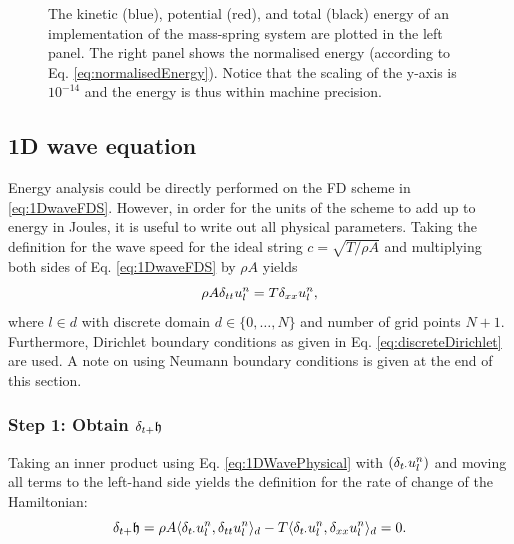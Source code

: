 {{\begin{figure}[h]
      \caption{The kinetic (blue), potential (red), and total (black) energy of an implementation of the mass-spring system are plotted in the left panel. The right panel shows the normalised energy (according to Eq. \eqref{eq:normalisedEnergy}). Notice that the scaling of the y-axis is $10^{-14}$ and the energy is thus within machine precision. \label{fig:energyMassSpring}}
\end{figure}

\subsection{1D wave equation}\label{sec:1DWaveEnergyAnalysis}
Energy analysis could be directly performed on the FD scheme in \eqref{eq:1DwaveFDS}. However, in order for the units of the scheme to add up to energy in Joules, it is useful to write out all physical parameters. Taking the definition for the wave speed for the ideal string $c = \sqrt{T/\rho A}$ and multiplying both sides of Eq. \eqref{eq:1DwaveFDS} by $\rho A$ yields
\begin{equation}\label{eq:1DWavePhysical}
    \rho A \delta_{tt} u_l^n = T \delta_{xx} u_l^n,
\end{equation}
where $l\in d$ with discrete domain $d\in\{0, \hdots, N\}$ and number of grid points $N+1$. Furthermore, Dirichlet boundary conditions as given in Eq. \eqref{eq:discreteDirichlet} are used. A note on using Neumann boundary conditions is given at the end of this section.

\subsubsection{Step 1: Obtain $\delta_{t+} \mathfrak{h}$}
Taking an inner product using Eq. \eqref{eq:1DWavePhysical} with $\left( \delta_{t\cdot} u_l^n \right)$ and moving all terms to the left-hand side yields the definition for the rate of change of the Hamiltonian:
\begin{equation}\label{eq:rOC1DWave}
    \delta_{t+} \mathfrak{h} = \rho A \langle \delta_{t\cdot} u_l^n, \delta_{tt} u_l^n \rangle_d - T \langle \delta_{t\cdot}u_l^n, \delta_{xx} u_l^n\rangle_d = 0.
\end{equation}


}}
